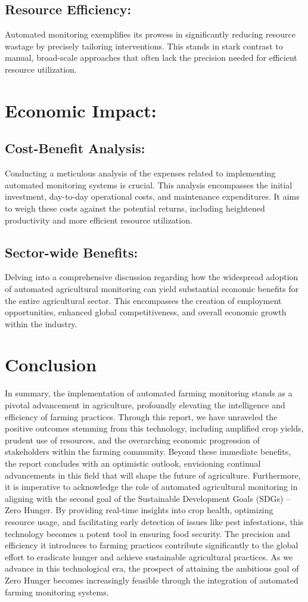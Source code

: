 \documentclass{article}
\begin{document}
\begin{enumerate}
\subsection{Resource Efficiency:}
Automated monitoring exemplifies its prowess in significantly reducing resource wastage by precisely tailoring interventions. This stands in stark contrast to manual, broad-scale approaches that often lack the precision needed for efficient resource utilization.
\section{Economic Impact:}
\subsection{Cost-Benefit Analysis:}
Conducting a meticulous analysis of the expenses related to implementing automated monitoring systems is crucial. This analysis encompasses the initial investment, day-to-day operational costs, and maintenance expenditures. It aims to weigh these costs against the potential returns, including heightened productivity and more efficient resource utilization.
\subsection{Sector-wide Benefits:}
Delving into a comprehensive discussion regarding how the widespread adoption of automated agricultural monitoring can yield substantial economic benefits for the entire agricultural sector. This encompasses the creation of employment opportunities, enhanced global competitiveness, and overall economic growth within the industry.
\section{Conclusion}
In summary, the implementation of automated farming monitoring stands as a pivotal advancement in agriculture, profoundly elevating the intelligence and efficiency of farming practices. Through this report, we have unraveled the positive outcomes stemming from this technology, including amplified crop yields, prudent use of resources, and the overarching economic progression of stakeholders within the farming community. Beyond these immediate benefits, the report concludes with an optimistic outlook, envisioning continual advancements in this field that will shape the future of agriculture.
Furthermore, it is imperative to acknowledge the role of automated agricultural monitoring in aligning with the second goal of the Sustainable Development Goals (SDGs) – Zero Hunger. By providing real-time insights into crop health, optimizing resource usage, and facilitating early detection of issues like pest infestations, this technology becomes a potent tool in ensuring food security. The precision and efficiency it introduces to farming practices contribute significantly to the global effort to eradicate hunger and achieve sustainable agricultural practices. As we advance in this technological era, the prospect of attaining the ambitious goal of Zero Hunger becomes increasingly feasible through the integration of automated farming monitoring systems.

\end{enumerate}
\end{document}
